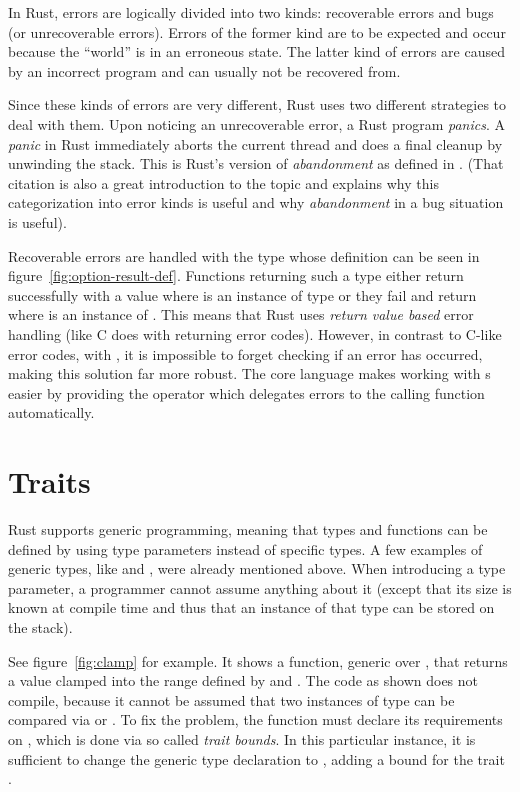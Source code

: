 In Rust, errors are logically divided into two kinds: recoverable errors and bugs (or unrecoverable errors).
Errors of the former kind are to be expected and occur because the \enquote{world} is in an erroneous state.
The latter kind of errors are caused by an incorrect program and can usually not be recovered from.

Since these kinds of errors are very different, Rust uses two different strategies to deal with them.
Upon noticing an unrecoverable error, a Rust program \emph{panics}.
A \emph{panic} in Rust immediately aborts the current thread and does a final cleanup by unwinding the stack.
This is Rust's version of \emph{abandonment} as defined in \cite{duffy2016error}.
(That citation is also a great introduction to the topic and explains why this categorization into error kinds is useful and why \emph{abandonment} in a bug situation is useful).

Recoverable errors are handled with the  type whose definition can be seen in figure~\ref{fig:option-result-def}.
Functions returning such a type either return successfully with a value  where  is an instance of type  or they fail and return  where  is an instance of .
This means that Rust uses \emph{return value based} error handling (like C does with returning error codes).
However, in contrast to C-like error codes, with , it is impossible to forget checking if an error has occurred, making this solution far more robust.
The core language makes working with s easier by providing the  operator which delegates errors to the calling function automatically.


\section{Traits}

Rust supports generic programming, meaning that types and functions can be defined by using type parameters instead of specific types.
A few examples of generic types, like  and , were already mentioned above.
When introducing a type parameter, a programmer cannot assume anything about it (except that its size is known at compile time and thus that an instance of that type can be stored on the stack).

See figure~\ref{fig:clamp} for example.
It shows a function, generic over , that returns a value clamped into the range defined by  and .
The code as shown does not compile, because it cannot be assumed that two instances of type  can be compared via \code{<} or \code{>}.
To fix the problem, the function must declare its requirements on , which is done via so called \emph{trait bounds}.
In this particular instance, it is sufficient to change the generic type declaration to , adding a bound for the trait .

